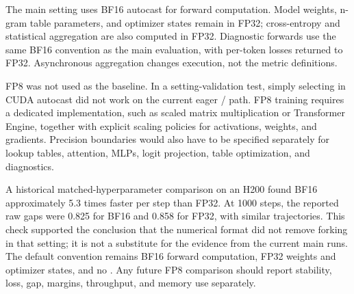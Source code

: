 The main setting uses BF16 autocast for forward computation. Model weights, n-gram table parameters, and optimizer states remain in FP32; cross-entropy and statistical aggregation are also computed in FP32. Diagnostic forwards use the same BF16 convention as the main evaluation, with per-token losses returned to FP32. Asynchronous aggregation changes execution, not the metric definitions.

FP8 was not used as the baseline. In a setting-validation test, simply selecting  in CUDA autocast did not work on the current eager / path. FP8 training requires a dedicated implementation, such as scaled matrix multiplication or Transformer Engine, together with explicit scaling policies for activations, weights, and gradients. Precision boundaries would also have to be specified separately for lookup tables, attention, MLPs, logit projection, table optimization, and diagnostics.

A historical matched-hyperparameter comparison on an H200 found BF16 approximately 5.3 times faster per step than FP32. At 1000 steps, the reported raw gaps were 0.825 for BF16 and 0.858 for FP32, with similar trajectories. This check supported the conclusion that the numerical format did not remove forking in that setting; it is not a substitute for the evidence from the current main runs. The default convention remains BF16 forward computation, FP32 weights and optimizer states, and no . Any future FP8 comparison should report stability, loss, gap, margins, throughput, and memory use separately.
